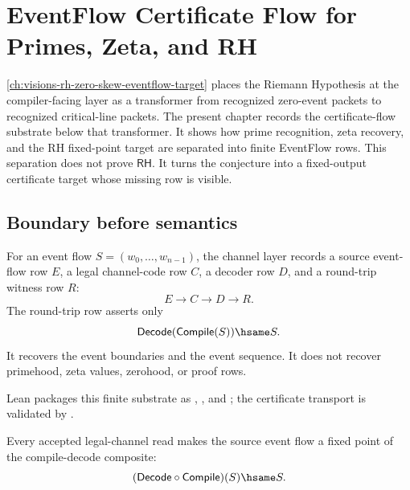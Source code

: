 \chapter{EventFlow Certificate Flow for Primes, Zeta, and RH}
\label{ch:visions-rh-eventflow-certificate-flow}

\autoref{ch:visions-rh-zero-skew-eventflow-target} places the Riemann
Hypothesis at the compiler-facing layer as a transformer from recognized
zero-event packets to recognized critical-line packets.  The present chapter
records the certificate-flow substrate below that transformer.  It shows how
prime recognition, zeta recovery, and the RH fixed-point target are separated
into finite EventFlow rows.  This separation does not prove $\mathsf{RH}$.
It turns the conjecture into a fixed-output certificate target whose missing
row is visible.

\section{Boundary before semantics}
\label{sec:rh-eventflow-boundary-before-semantics}

\begin{definition}
\label{def:rh-channel-fixed-boundary}
For an event flow $S=(w_0,\ldots,w_{n-1})$, the channel layer records a
source event-flow row $E$, a legal channel-code row $C$, a decoder row $D$,
and a round-trip witness row $R$:
$$
E\to C\to D\to R.
$$
The round-trip row asserts only
$$
\mathsf{Decode}(\mathsf{Compile}(S))\hsame S.
$$
It recovers the event boundaries and the event sequence.  It does not recover
primehood, zeta values, zerohood, or proof rows.
\end{definition}

Lean packages this finite substrate as
,
, and
; the
certificate transport is validated by
.

\begin{proposition}
\label{prop:rh-channel-reconstruction-boundary-fixed-point}
Every accepted legal-channel read makes the source event flow a fixed point
of the compile-decode composite:
$$
(\mathsf{Decode}\circ\mathsf{Compile})(S)\hsame S.
$$
\end{proposition}


